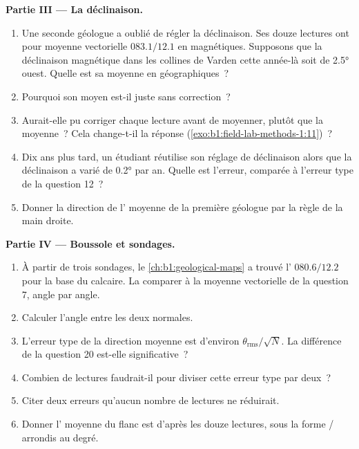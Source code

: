 \begin{problem}
\medskip
\noindent\textbf{Partie III --- La déclinaison.}
\begin{enumerate}[resume]
  \item Une seconde géologue a oublié de régler la déclinaison. Ses douze
        lectures ont pour moyenne vectorielle $083.1/12.1$ en 
        magnétiques. Supposons que la déclinaison magnétique dans les collines
        de Varden cette année-là soit de \ang{2.5} ouest. Quelle est sa moyenne
        en  géographiques~?
  \item Pourquoi son  moyen est-il juste sans correction~?
  \item Aurait-elle pu corriger chaque lecture avant de moyenner, plutôt que la
        moyenne~? Cela change-t-il la réponse
        (\cref{exo:b1:field-lab-methods-1:11})~?
  \item Dix ans plus tard, un étudiant réutilise son réglage de déclinaison alors
        que la déclinaison a varié de \ang{0.2} par an. Quelle est l'erreur,
        comparée à l'erreur type de la question 12~?
  \item Donner la direction de l' moyenne de la première géologue par la
        règle de la main droite.
\end{enumerate}

\medskip
\noindent\textbf{Partie IV --- Boussole et sondages.}
\begin{enumerate}[resume]
  \item À partir de trois sondages, le \cref{ch:b1:geological-maps} a trouvé
        l' $080.6/12.2$ pour la base du calcaire. La comparer à la
        moyenne vectorielle de la question 7, angle par angle.
  \item Calculer l'angle entre les deux normales.
  \item L'erreur type de la direction moyenne est d'environ
        $\theta_{\text{rms}}/\sqrt N$. La différence de la question 20 est-elle
        significative~?
  \item Combien de lectures faudrait-il pour diviser cette erreur type par
        deux~?
  \item Citer deux erreurs qu'aucun nombre de lectures ne réduirait.
  \item Donner l' moyenne du flanc est d'après les douze lectures, sous
        la forme / arrondis au degré.
\end{enumerate}
\end{problem}
